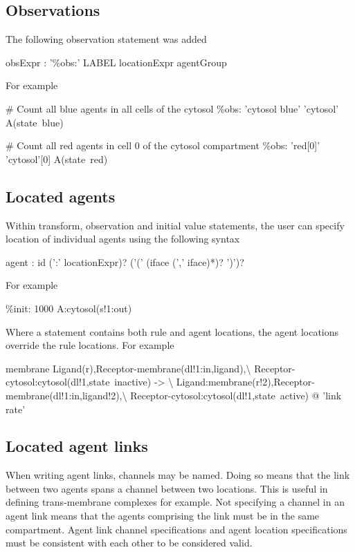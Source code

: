 \subsection{Observations}

The following observation statement was added

\begin{bnfsource}
obsExpr :
  '\%obs:' LABEL locationExpr agentGroup
\end{bnfsource}
For example
\begin{kappasource}
# Count all blue agents in all cells of the cytosol
\%obs: 'cytosol blue' 'cytosol' A(state~blue)

# Count all red agents in cell 0 of the cytosol compartment
\%obs: 'red[0]' 'cytosol'[0] A(state~red) 
\end{kappasource}

\subsection{Located agents}

Within transform, observation and initial value statements, the user can specify location of individual agents using the following syntax
\begin{bnfsource}
agent :
  id (':' locationExpr)? ('(' (iface (',' iface)*)? ')')?
\end{bnfsource}
For example
\begin{kappasource}
\%init: 1000 A:cytosol(s!1:out)
\end{kappasource}

Where a statement contains both rule and agent locations, the agent locations override the rule locations. For example
\begin{kappasource}
membrane Ligand(r),Receptor-membrane(dl!1:in,ligand),{\textbackslash}
    Receptor-cytosol:cytosol(dl!1,state~inactive) -> {\textbackslash}
    Ligand:membrane(r!2),Receptor-membrane(dl!1:in,ligand!2),{\textbackslash}
    Receptor-cytosol:cytosol(dl!1,state~active) @ 'link rate'
\end{kappasource}

\subsection{Located agent links}

When writing agent links, channels may be named. Doing so means that the link between two agents spans a channel between two locations. This is useful in defining trans-membrane complexes for example. Not specifying a channel in an agent link means that the agents comprising the link must be in the same compartment. Agent link channel specifications and agent location specifications must be consistent with each other to be considered valid.

